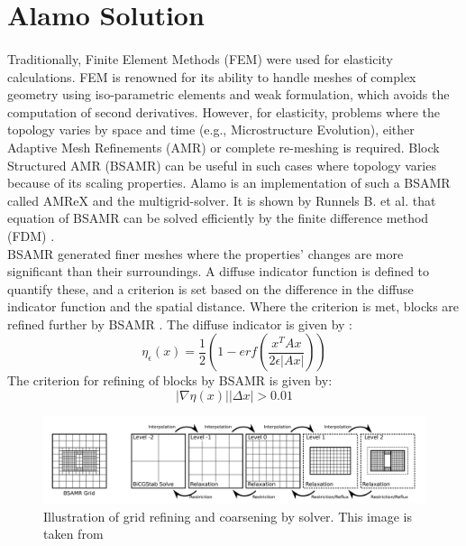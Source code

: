 \documentclass[12pt, a4paper]{report}
\begin{document}
\section{Alamo Solution}
\paragraph{}
Traditionally, Finite Element Methods (FEM) were used for elasticity calculations. FEM is renowned for its ability to handle meshes of complex geometry using iso-parametric elements and weak formulation, which avoids the computation of second derivatives. However, for elasticity, problems where the topology varies by space and time (e.g., Microstructure Evolution), either Adaptive Mesh Refinements (AMR) or complete re-meshing is required. Block Structured AMR (BSAMR) can be useful in such cases where topology varies because of its scaling properties. Alamo is an implementation of such a BSAMR called AMReX and the multigrid-solver. It is shown by Runnels B. et al. that equation of BSAMR can be solved efficiently by the finite difference method (FDM) \cite{Runnels_2021}. \\


BSAMR generated finer meshes where the properties’ changes are more significant than their surroundings. A diffuse indicator function is defined to quantify these, and a criterion is set based on the difference in the diffuse indicator function and the spatial distance. Where the criterion is met, blocks are refined further by BSAMR \cite{Runnels_2021}. The diffuse indicator is given by :
\begin{equation}
    \eta_{\epsilon}(x) = \frac{1}{2} \left(1 - erf\left(\frac{x^TAx}{2\epsilon \left|Ax\right|}\right)\right)
\end{equation}
The criterion for refining of blocks by BSAMR is given by:
\begin{equation}
    \left|\nabla \eta (x) \right|\left|\Delta x\right| > 0.01
\end{equation}

\begin{figure}[H]
    \includegraphics[width=\textwidth]{images/BSAMR Grid.png}
    \caption{Illustration of grid refining and coarsening by solver. This image is taken from \cite{Runnels_2021}}
    \label{fig:BSAMRGrid}
\end{figure}
\end{document}
